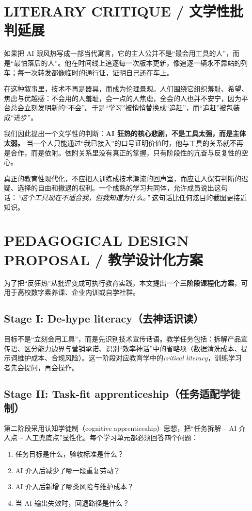 \documentclass[11pt,a4paper]{ctexart}
\begin{document}
\section{LITERARY CRITIQUE / 文学性批判延展}
如果把 AI 跟风热写成一部当代寓言，它的主人公并不是“最会用工具的人”，而是“最怕落后的人”。他在时间线上追逐每一次版本更新，像追逐一辆永不靠站的列车；每一次转发都像临时的通行证，证明自己还在车上。

在这种叙事里，技术不再是器具，而成为伦理景观。人们围绕它组织羞耻、希望、焦虑与优越感：不会用的人羞耻，会一点的人焦虑，全会的人也并不安宁，因为平台总会立刻发明新的“不会”。于是“学习”被悄悄替换成“追赶”，而“追赶”被包装成“进步”。

我们因此提出一个文学性的判断：\textbf{AI 狂热的核心悲剧，不是工具太强，而是主体太弱。} 当一个人只能通过“我已接入”的口号证明价值时，他与工具的关系就不再是合作，而是依附。依附关系里没有真正的掌握，只有阶段性的亢奋与反复性的空心。

真正的教育性现代化，不应把人训练成技术潮流的回声室，而应让人保有判断的迟疑、选择的自由和撤退的权利。一个成熟的学习共同体，允许成员说出这句话：\textit{“这个工具现在不适合我，但我知道为什么。”} 这句话比任何炫目的截图更接近知识。

\section{PEDAGOGICAL DESIGN PROPOSAL / 教学设计化方案}
为了把“反狂热”从批评变成可执行教育实践，本文提出一个\textbf{三阶段课程化方案}，可用于高校数字素养课、企业内训或自学社群。

\subsection{Stage I: De-hype literacy（去神话识读）}
目标不是“立刻会用工具”，而是先识别技术宣传话语。教学任务包括：拆解产品宣传语、区分能力边界与营销承诺、识别“效率神话”中的省略项（数据清洗成本、提示词维护成本、合规风险）。这一阶段对应教育学中的\textit{critical literacy}，训练学习者先会提问，再会操作。

\subsection{Stage II: Task-fit apprenticeship（任务适配学徒制）}
第二阶段采用认知学徒制（cognitive apprenticeship）思想，把“任务拆解 -- AI 介入点 -- 人工兜底点”显性化。每个学习单元都必须回答四个问题：
\begin{enumerate}[leftmargin=1.2em]
\item 任务目标是什么，验收标准是什么？
\item AI 介入后减少了哪一段重复劳动？
\item AI 介入后新增了哪类风险与维护成本？
\item 当 AI 输出失效时，回退路径是什么？
\end{enumerate}
\end{document}
